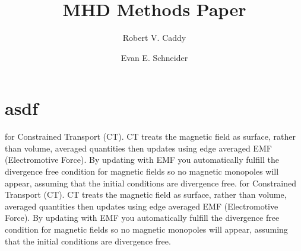 \documentclass[]{aastex631}
\newcommand*{\img}[1]{%
    \raisebox{-.3\baselineskip}{%
        \texttt{[image: \#1]}%
    }%
}
\begin{document}
\title{MHD Methods Paper}

\author[0000-0002-4475-3181]{Robert V. Caddy}

\author[0000-0001-9735-7484]{Evan E. Schneider}



\section{asdf}

for Constrained Transport (CT). CT treats the magnetic field as surface, rather than volume, averaged quantities then updates using edge averaged EMF (Electromotive Force). By updating with EMF you automatically fulfill the divergence free condition for magnetic fields so no magnetic monopoles will appear, assuming that the initial conditions are divergence free.
\href{http://www.overleaf.com}{\img{latex-src/orcid-ID.png}} 
for Constrained Transport (CT). CT treats the magnetic field as surface, rather than volume, averaged quantities then updates using edge averaged EMF (Electromotive Force). By updating with EMF you automatically fulfill the divergence free condition for magnetic fields so no magnetic monopoles will appear, assuming that the initial conditions are divergence free.








\appendix





\end{document}

